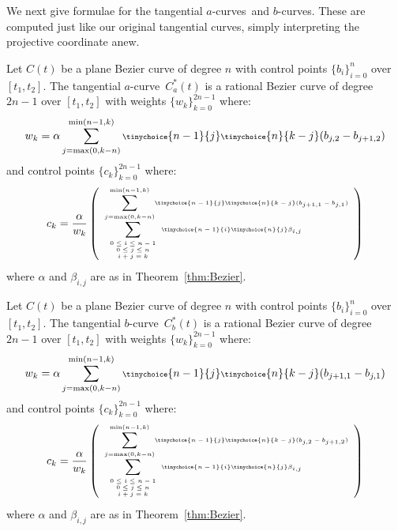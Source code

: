 \documentclass[10pt,twocolumn]{article}
\newcommand{\atang}{tangential $a$-curve\ }
\newcommand{\btang}{tangential $b$-curve\ }
\newcommand{\atangs}{tangential $a$-curves\ }
\begin{document}
We next give formulae for the \atangs and $b$-curves.
These are computed just like our original tangential curves,
simply interpreting the projective coordinate anew.
%
\begin{theorem}
\label{thm:rationalduala}
Let $C(t)$ be a plane Bezier curve of degree $n$ 
with control points $\{ b_i \}_{i=0}^n$ over $[t_1,t_2]$.
The \atang $C_a^*(t)$ is a rational Bezier curve of degree $2n-1$ 
over $[t_1,t_2]$ with weights $\{w_k\}_{k=0}^{2n-1}$ where: 
\begin{displaymath}
\scriptsize{
w_k = \alpha
\sum_{j=\mbox{max}(0,k-n)}^{\mbox{min}(n-1,k)} 
\tinychoice{n-1}{j} \tinychoice{n}{k-j} (b_{j,2} - b_{j+1,2})
}
\end{displaymath}
%
and control points $\{c_k\}_{k=0}^{2n-1}$ where:
\begin{displaymath}
\tiny{
c_k = \frac{\alpha}{w_k} 
\left(
\begin{array}{l}
	\displaystyle{\sum_{j=\mbox{\tiny{max}}(0,k-n)}^{\mbox{\tiny{min}}(n-1,k)}}
	\tinychoice{n-1}{j} \tinychoice{n}{k-j} (b_{j+1,1} - b_{j,1})\\
	\displaystyle{\sum_{\begin{array}{c} \mbox{\tiny{$0 \leq i \leq n-1$}} \\ 
			     \mbox{\tiny{$0 \leq j \leq n$}} \\ 
			     \mbox{\tiny{$i+j=k$}}
			     \end{array}}}
\tinychoice{n-1}{i} \tinychoice{n}{j} \beta_{i,j}
\end{array}
\right)
}
\end{displaymath}
where $\alpha$ and $\beta_{i,j}$ are as in Theorem~\ref{thm:Bezier}.
\end{theorem}

\begin{theorem}
\label{thm:rationaldualb}
Let $C(t)$ be a plane Bezier curve of degree $n$ 
with control points $\{ b_i \}_{i=0}^n$ over $[t_1,t_2]$.
The \btang $C_b^*(t)$ is a rational Bezier curve of degree $2n-1$ 
over $[t_1,t_2]$ with weights $\{w_k\}_{k=0}^{2n-1}$ where: 
\begin{displaymath}
\scriptsize{
w_k = \alpha
\sum_{j=\mbox{max}(0,k-n)}^{\mbox{min}(n-1,k)} 
\tinychoice{n-1}{j} \tinychoice{n}{k-j} (b_{j+1,1} - b_{j,1})
}
\end{displaymath}
%
and control points $\{c_k\}_{k=0}^{2n-1}$ where:
\begin{displaymath}
\tiny{
c_k = \frac{\alpha}{w_k} 
\left(
\begin{array}{l}
	\displaystyle{\sum_{j=\mbox{\tiny{max}}(0,k-n)}^{\mbox{\tiny{min}}(n-1,k)}}
	\tinychoice{n-1}{j} \tinychoice{n}{k-j} (b_{j,2} - b_{j+1,2})\\
	\displaystyle{\sum_{\begin{array}{c} \mbox{\tiny{$0 \leq i \leq n-1$}} \\ 
			     \mbox{\tiny{$0 \leq j \leq n$}} \\ 
			     \mbox{\tiny{$i+j=k$}}
			     \end{array}}}
\tinychoice{n-1}{i} \tinychoice{n}{j} \beta_{i,j}
\end{array}
\right)
}
\end{displaymath}
where $\alpha$ and $\beta_{i,j}$ are as in Theorem~\ref{thm:Bezier}.
\end{theorem}
\end{document}
